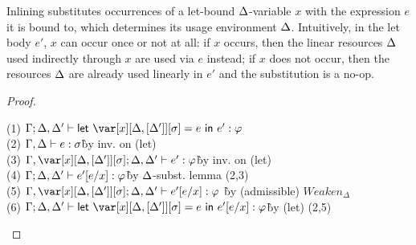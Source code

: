 Inlining substitutes occurrences of a let-bound $\Delta$-variable $x$
with the expression $e$ it is bound to, which determines its usage environment
$\Delta$. Intuitively, in the let body $e'$, $x$ can occur once or not at all: if
$x$ occurs, then the linear resources $\Delta$ used indirectly through $x$ are used
via $e$ instead; if $x$ does not occur, then the resources $\Delta$ are already
used linearly in $e'$ and the substitution is a no-op.

\InliningTheorem

\begin{proof}~

\begin{tabbing}
    (1) $\G;\D,\D' \vdash \llet{\xD = e}{e'} : \vp$\\
    (2) $\Gamma,\Delta \vdash e : \sigma$\` by inv. on (let)\\
    (3) $\G,\xD; \D, \D' \vdash e' : \vp$\` by inv. on (let)\\
    (4) $\Gamma;\Delta,\Delta' \vdash e'[e/x] : \varphi$\` by $\Delta$-subst. lemma (2,3)\\
    (5) $\G,\xD; \D,\D' \vdash e'[e/x] : \vp$ \` by (admissible) $Weaken_\Delta$\\
    (6) $\G;\D,\D' \vdash \llet{\xD = e}{e'[e/x]} : \vp$\` by (let) (2,5)\\
\end{tabbing}
\end{proof}

